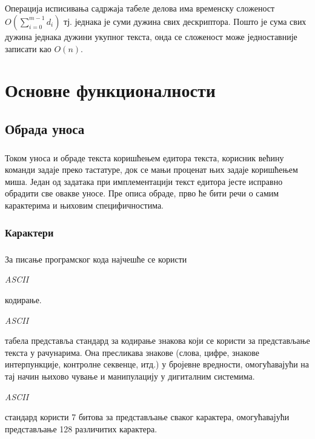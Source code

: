 \documentclass[12pt,oneside]{memoir}
\begin{document}
\paragraph{}
Операција исписивања садржаја табеле делова има временску сложеност
\(O(\sum_{i=0}^{m-1} d_i)\) тј. једнака је суми дужина свих дескриптора. 
Пошто је сума свих дужина једнака дужини укупног текста, онда се сложеност може
једноставније записати као \(O(n)\).

\chapter{Основне функционалности}
\label{chp:osnovne_funkcionalnosti}

\section{Обрада уноса}
\paragraph{}
Током уноса и обраде текста коришћењем едитора текста, корисник већину команди задаје преко тастатуре, док се мањи проценат њих задаје коришћењем миша. Један од задатака при 
имплементацији текст едитора јесте исправно обрадити све овакве уносе. 
Пре описа обраде, прво ће бити речи о самим карактерима и њиховим специфичностима. 

\subsection{Карактери}
\paragraph{}
За писање програмског кода најчешће се користи \begin{latinica}\textit{ASCII}\end{latinica} кодирање. \begin{latinica}\textit{ASCII}\end{latinica} табела представља стандард за кодирање
знакова који се користи за представљање текста у рачунарима. Она пресликава знакове
(слова, цифре, знакове интерпункције, контролне секвенце, итд.) у бројевне вредности,
омогућавајући на тај начин њихово чување и манипулацију у дигиталним системима. 
\begin{latinica}\textit{ASCII}\end{latinica} стандард користи 7 битова за представљање
сваког карактера, омогућавајући представљање 128 различитих карактера.
\end{document}
